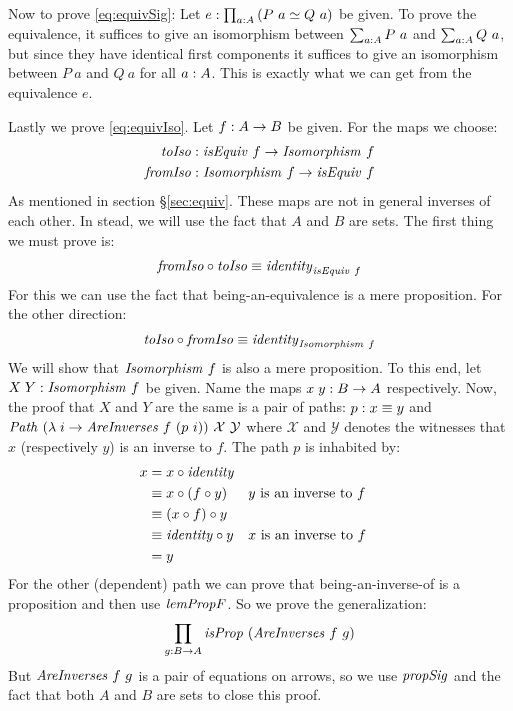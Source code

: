 Now to prove \ref{eq:equivSig}: Let $e \mathrel{:} \prod_{a \mathrel{:} A} \left( P\ a
\simeq Q\ a \right)$ be given. To prove the equivalence, it suffices
to give an isomorphism between $\sum_{a \mathrel{:} A} P\ a$ and $\sum_{a \mathrel{:}
  A} Q\ a$, but since they have identical first components it suffices
to give an isomorphism between $P\ a$ and $Q\ a$ for all $a \mathrel{:} A$.
This is exactly what we can get from the equivalence $e$.\QED

Lastly we prove \ref{eq:equivIso}. Let $f \mathrel{:} A \to B$ be given. For the maps we
choose:
%
\begin{align*}
\var{toIso}
  & \tp \isEquiv\ f             \to \Isomorphism\ f \\
\var{fromIso}
  & \tp \Isomorphism\ f \to \isEquiv\ f
\end{align*}
%
As mentioned in section \S\ref{sec:equiv}. These maps are not in general inverses
of each other. In stead, we will use the fact that $A$ and $B$ are sets. The first thing we must prove is:
%
\begin{align*}
  \var{fromIso} \comp \var{toIso} \equiv \identity_{\isEquiv\ f}
\end{align*}
%
For this we can use the fact that being-an-equivalence is a mere proposition.
For the other direction:
%
\begin{align*}
  \var{toIso} \comp \var{fromIso} \equiv \identity_{\Isomorphism\ f}
\end{align*}
%
We will show that $\Isomorphism\ f$ is also a mere proposition. To this
end, let $X\;Y \tp \Isomorphism\ f$ be given. Name the maps $x\;y \mathrel{:} B
\to A$ respectively. Now, the proof that $X$ and $Y$ are the same is a pair of
paths: $p \mathrel{:} x \equiv y$ and $\Path\ (\lambda\; i \to
\var{AreInverses}\ f\ (p\ i))\ \mathcal{X}\ \mathcal{Y}$ where $\mathcal{X}$
and $\mathcal{Y}$ denotes the witnesses that $x$ (respectively $y$) is an
inverse to $f$. The path $p$ is inhabited by:
%
\begin{align*}
  x
  & = x \comp \identity \\
  & \equiv x \comp (f \comp y)
  && \text{$y$ is an inverse to $f$} \\
  & \equiv (x \comp f) \comp y \\
  & \equiv \identity \comp y
  && \text{$x$ is an inverse to $f$} \\
  & = y
\end{align*}
%
For the other (dependent) path we can prove that being-an-inverse-of is a
proposition and then use $\lemPropF$. So we prove the generalization:
%
\begin{align}
\label{eq:propAreInversesGen}
\prod_{g \tp B \to A} \isProp\ (\var{AreInverses}\ f\ g)
\end{align}
%
But $\var{AreInverses}\ f\ g$ is a pair of equations on arrows, so we use
$\propSig$ and the fact that both $A$ and $B$ are sets to close this proof.


